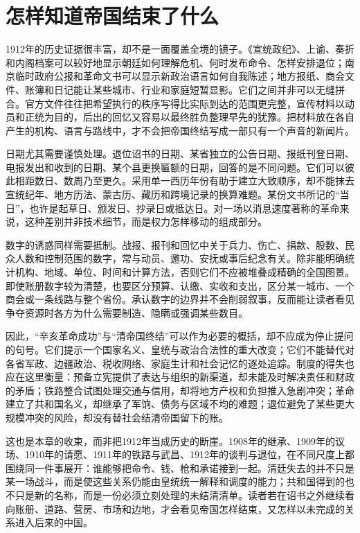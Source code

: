\section{怎样知道帝国结束了什么}

1912年的历史证据很丰富，却不是一面覆盖全境的镜子。《宣统政纪》、上谕、奏折和内阁档案可以较好地显示朝廷如何理解危机、何时发布命令、怎样安排退位；南京临时政府公报和革命文书可以显示新政治语言如何自我陈述；地方报纸、商会文件、账簿和日记能让某些城市、行业和家庭短暂显影。它们之间并非可以无缝拼合。官方文件往往把希望执行的秩序写得比实际到达的范围更完整，宣传材料以动员和正统为目的，后出的回忆又容易以最终胜负整理早先的犹豫。把材料放在各自产生的机构、语言与路线中，才不会把帝国终结写成一部只有一个声音的新闻片。

日期尤其需要谨慎处理。退位诏书的日期、某省独立的公告日期、报纸刊登日期、电报发出和收到的日期、某个县更换匾额的日期，回答的是不同问题。它们可以彼此相距数日、数周乃至更久。采用单一西历年份有助于建立大致顺序，却不能抹去宣统纪年、地方历法、蒙古历、藏历和跨境记录的换算难题。某份文书所记的“当日”，也许是起草日、颁发日、抄录日或抵达日。对一场以消息速度著称的革命来说，这种差别并非技术细节，而是权力怎样移动的组成部分。

数字的诱惑同样需要抵制。战报、报刊和回忆中关于兵力、伤亡、捐款、股数、民众人数和控制范围的数字，常与动员、邀功、安抚或事后纪念有关。除非能明确统计机构、地域、单位、时间和计算方法，否则它们不应被堆叠成精确的全国图景。即使账册数字较为清楚，也要区分预算、认缴、实收和支出，区分某一城市、一个商会或一条线路与整个省份。承认数字的边界并不会削弱叙事，反而能让读者看见争夺资源时各方为什么需要制造、隐瞒或强调某些数目。

因此，“辛亥革命成功”与“清帝国终结”可以作为必要的概括，却不应成为停止提问的句号。它们提示一个国家名义、皇统与政治合法性的重大改变；它们不能替代对各省军政、边疆政治、税收网络、家庭生计和社会记忆的逐处追踪。制度的得失也应在这里衡量：预备立宪提供了表达与组织的新渠道，却未能及时解决责任和财政的矛盾；铁路整合试图处理交通与信用，却将地方产权和负担推入急剧冲突；革命建立了共和国名义，却继承了军饷、债务与区域不均的难题；退位避免了某些更大规模冲突的风险，却没有替社会结清帝国留下的账。

这也是本章的收束，而非把1912年当成历史的断崖。1908年的继承、1909年的议场、1910年的请愿、1911年的铁路与武昌、1912年的谈判与退位，在不同尺度上都围绕同一件事展开：谁能够把命令、钱、枪和承诺接到一起。清廷失去的并不只是某一场战斗，而是使这些关系仍能由皇统统一解释和调度的能力；共和国得到的也不只是新的名称，而是一份必须立刻处理的未结清清单。读者若在诏书之外继续看向账册、道路、营房、市场和边地，才会看见帝国怎样结束，又怎样以未完成的关系进入后来的中国。

